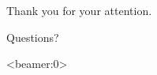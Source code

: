 \documentclass[final,ignorenonframetext,compress]{beamer}
\begin{document}
    \begin{frame}
        \begin{center}
            Thank you for your attention.

            Questions?
        \end{center}
    \end{frame}
    \begin{frame}<beamer:0>
        
        
    \end{frame}

	
\end{document}
